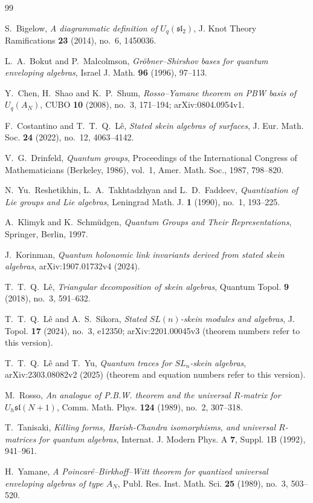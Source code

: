\documentclass[11pt]{article}
\theoremstyle{remark}
\begin{document}
\begin{thebibliography}{99}

S.~Bigelow,
\emph{A diagrammatic definition of $U_q(\mathfrak{sl}_2)$},
J. Knot Theory Ramifications \textbf{23} (2014), no.~6, 1450036.

L.~A.~Bokut and P.~Malcolmson,
\emph{Gr\"obner--Shirshov bases for quantum enveloping algebras},
Israel J. Math. \textbf{96} (1996), 97--113.

Y.~Chen, H.~Shao and K.~P.~Shum,
\emph{Rosso--Yamane theorem on PBW basis of $U_q(A_N)$},
CUBO \textbf{10} (2008), no.~3, 171--194; arXiv:0804.0954v1.

F.~Costantino and T.~T.~Q.~L\^e,
\emph{Stated skein algebras of surfaces},
J. Eur. Math. Soc. \textbf{24} (2022), no.~12, 4063--4142.

V.~G.~Drinfeld,
\emph{Quantum groups},
Proceedings of the International Congress of Mathematicians (Berkeley,
1986), vol.~1, Amer. Math. Soc., 1987, 798--820.

N.~Yu.~Reshetikhin, L.~A.~Takhtadzhyan and L.~D.~Faddeev,
\emph{Quantization of Lie groups and Lie algebras},
Leningrad Math. J. \textbf{1} (1990), no.~1, 193--225.

A.~Klimyk and K.~Schm\"udgen,
\emph{Quantum Groups and Their Representations},
Springer, Berlin, 1997.

J.~Korinman,
\emph{Quantum holonomic link invariants derived from stated skein
algebras}, arXiv:1907.01732v4 (2024).

T.~T.~Q.~L\^e,
\emph{Triangular decomposition of skein algebras},
Quantum Topol. \textbf{9} (2018), no.~3, 591--632.

T.~T.~Q.~L\^e and A.~S.~Sikora,
\emph{Stated $SL(n)$-skein modules and algebras},
J. Topol. \textbf{17} (2024), no.~3, e12350; arXiv:2201.00045v3
(theorem numbers refer to this version).

T.~T.~Q.~L\^e and T.~Yu,
\emph{Quantum traces for $SL_n$-skein algebras},
arXiv:2303.08082v2 (2025) (theorem and equation numbers refer to this
version).

M.~Rosso,
\emph{An analogue of P.B.W. theorem and the universal $R$-matrix for
$U_h\mathfrak{sl}(N+1)$},
Comm. Math. Phys. \textbf{124} (1989), no.~2, 307--318.

T.~Tanisaki,
\emph{Killing forms, Harish-Chandra isomorphisms, and universal
$R$-matrices for quantum algebras},
Internat. J. Modern Phys. A \textbf{7}, Suppl. 1B (1992), 941--961.

H.~Yamane,
\emph{A Poincar\'e--Birkhoff--Witt theorem for quantized universal
enveloping algebras of type $A_N$},
Publ. Res. Inst. Math. Sci. \textbf{25} (1989), no.~3, 503--520.

\end{thebibliography}
\end{document}
